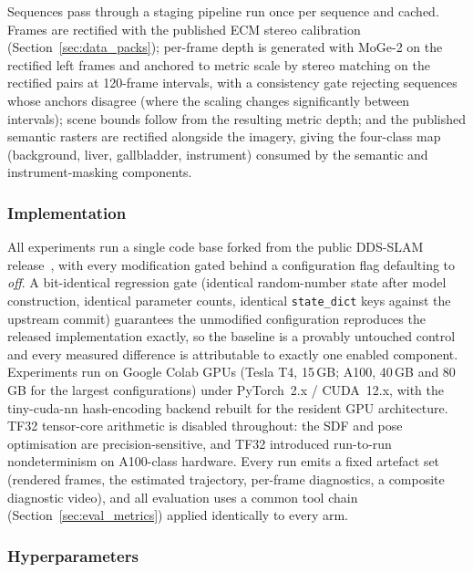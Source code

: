 \documentclass{article}
\begin{document}
Sequences pass through a staging pipeline run once per sequence and cached. Frames are rectified with the published ECM stereo calibration (Section~\ref{sec:data_packs}); per-frame depth is generated with MoGe-2 on the rectified left frames and anchored to metric scale by stereo matching on the rectified pairs at 120-frame intervals, with a consistency gate rejecting sequences whose anchors disagree (where the scaling changes significantly between intervals); scene bounds follow from the resulting metric depth; and the published semantic rasters are rectified alongside the imagery, giving the four-class map (background, liver, gallbladder, instrument) consumed by the semantic and instrument-masking components.

\subsubsection{Implementation}

All experiments run a single code base forked from the public DDS-SLAM release~\cite{Shan2024}, with every modification gated behind a configuration flag defaulting to \emph{off}. A bit-identical regression gate (identical random-number state after model construction, identical parameter counts, identical \texttt{state\_dict} keys against the upstream commit) guarantees the unmodified configuration reproduces the released implementation exactly, so the baseline is a provably untouched control and every measured difference is attributable to exactly one enabled component. Experiments run on Google Colab GPUs (Tesla T4, 15\,GB; A100, 40\,GB and 80\,GB for the largest configurations) under PyTorch~2.x / CUDA~12.x, with the tiny-cuda-nn hash-encoding backend rebuilt for the resident GPU architecture. TF32 tensor-core arithmetic is disabled throughout: the SDF and pose optimisation are precision-sensitive, and TF32 introduced run-to-run nondeterminism on A100-class hardware. Every run emits a fixed artefact set (rendered frames, the estimated trajectory, per-frame diagnostics, a composite diagnostic video), and all evaluation uses a common tool chain (Section~\ref{sec:eval_metrics}) applied identically to every arm.

\subsubsection{Hyperparameters}
\label{sec:hyperparams}
\end{document}
